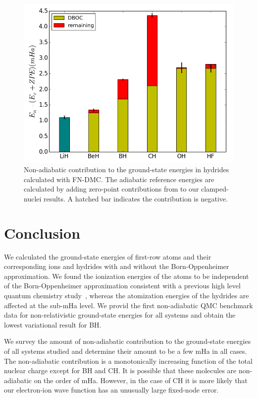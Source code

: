 \documentclass[pra,superscriptaddress,groupedaddress,twocolumn]{revtex4}
\begin{document}
\begin{figure}[h]
\includegraphics[scale=.37]{Figures/dia-nad-ad}
\caption{Non-adiabatic contribution to the ground-state energies in hydrides calculated with FN-DMC. The adiabatic reference energies are calculated by adding zero-point contributions from \cite{Feller_Corrections} to our clamped-nuclei results. A hatched bar indicates the contribution is negative. \label{fig:dia-nad-ad}}
\end{figure}

\section{Conclusion}
We calculated the ground-state energies of first-row atoms and their corresponding ions and hydrides with and without the Born-Oppenheimer approximation. We found the ionization energies of the atoms to be independent of the Born-Oppenheimer approximation consistent with a previous high level quantum chemistry study~\cite{Klopper_IP}, whereas the atomization energies of the hydrides are affected at the sub-mHa level. We provid the first non-adiabatic QMC benchmark data for non-relativistic ground-state energies for all systems and obtain the lowest variational result for BH. %

We survey the amount of non-adiabatic contribution to the ground-state energies of all systems studied and determine their amount to be a few mHa in all cases. The non-adiabatic contribution is a monotonically increasing function of the total nuclear charge except for BH and CH. It is possible that these molecules are non-adiabatic on the order of mHa. However, in the case of CH it is more likely that our electron-ion wave function has an unusually large fixed-node error.
\end{document}
